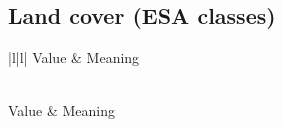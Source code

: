 \documentclass[letterpaper,10pt,english]{sphinxmanual}
\begin{document}
\subsection{Land cover (ESA classes)}
\label{\detokenize{Introduction/Layers:land-cover-esa-classes}}

\begin{savenotes}\sphinxatlongtablestart\begin{longtable}[c]{|l|l|}
\hline
\sphinxstyletheadfamily 
\sphinxAtStartPar
Value
&\sphinxstyletheadfamily 
\sphinxAtStartPar
Meaning
\\
\hline
\endfirsthead

%
{}\\
\hline
\sphinxstyletheadfamily 
\sphinxAtStartPar
Value
&\sphinxstyletheadfamily 
\sphinxAtStartPar
Meaning
\\
\hline
\endhead

\hline
{}\\
\endfoot

\endlastfoot


\end{longtable}
\end{savenotes}
\end{document}
